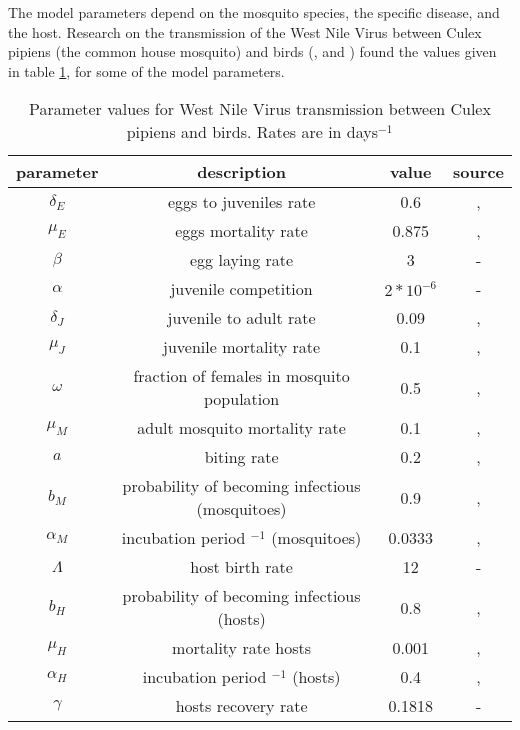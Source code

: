 \documentclass{article}
\begin{document}
The model parameters depend on the mosquito species, the specific disease, and the host. 
Research on the transmission of the West Nile Virus between Culex pipiens 
(the common house mosquito) and birds (\cite{Heidecke2024.09.16.613097}, and \cite{Vogels2017-li}) found the 
values given in table \ref{tab:parameters}, for some of the model parameters.
\begin{table}[h!]
\centering
\begin{tabular}{|c|c|c|c|}
\hline
\textbf{parameter} & \textbf{description} & \textbf{value} & \textbf{source}\\
\hline
$\delta_E$ & eggs to juveniles rate & 0.6 & \cite{Heidecke2024.09.16.613097}, \cite{Vogels2017-li}\\
$\mu_E$ & eggs mortality rate & 0.875 & \cite{Heidecke2024.09.16.613097}, \cite{Vogels2017-li}\\
$\beta$ & egg laying rate & 3 & -\\
$\alpha$ & juvenile competition & $2*10^{-6}$ & -\\
$\delta_J$ & juvenile to adult rate & 0.09 & \cite{Heidecke2024.09.16.613097}, \cite{Vogels2017-li}\\
$\mu_J$ & juvenile mortality rate & 0.1 & \cite{Heidecke2024.09.16.613097}, \cite{Vogels2017-li}\\
$\omega$ & fraction of females in mosquito population & 0.5 & \cite{Heidecke2024.09.16.613097}, \cite{Vogels2017-li}\\
$\mu_M$ & adult mosquito mortality rate & 0.1 & \cite{Heidecke2024.09.16.613097}, \cite{Vogels2017-li}\\
$a$ & biting rate & 0.2 & \cite{Heidecke2024.09.16.613097}, \cite{Vogels2017-li}\\
$b_M$ & probability of becoming infectious (mosquitoes) & 0.9 & \cite{Heidecke2024.09.16.613097}, \cite{Vogels2017-li}\\
$\alpha_M$ & incubation period $^{-1}$ (mosquitoes) & 0.0333 & \cite{Heidecke2024.09.16.613097}, \cite{Vogels2017-li}\\
$\Lambda$ & host birth rate & 12 & -\\
$b_H$ & probability of becoming infectious (hosts) & 0.8 & \cite{Heidecke2024.09.16.613097}, \cite{Vogels2017-li}\\
$\mu_H$ & mortality rate hosts & 0.001 & \cite{Heidecke2024.09.16.613097}, \cite{Vogels2017-li}\\
$\alpha_H$ & incubation period $^{-1}$ (hosts) & 0.4 & \cite{Heidecke2024.09.16.613097}, \cite{Vogels2017-li}\\
$\gamma$ & hosts recovery rate & 0.1818 & -\\
\hline
\end{tabular}
\caption{Parameter values for West Nile Virus transmission between Culex pipiens and birds. Rates are in days$^{-1}$}
\label{tab:parameters}
\end{table}
\end{document}
